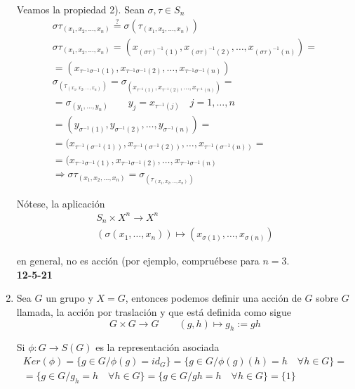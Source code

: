 \documentclass{article}
\begin{document}
\begin{enumerate}[1)]
Veamos la propiedad 2). Sean $\sigma, \tau \in S_n$
\begin{gather*}
\sigma\tau_{(x_1,x_2,\ldots,x_n)} \overset{?}{=} \sigma(\tau_{(x_1,x_2,\ldots,x_n)}) \\
\sigma\tau_{(x_1,x_2,\ldots,x_n)}=(x_{(\sigma\tau)^{-1}(1)},x_{(\sigma\tau)^{-1}(2)},\ldots,x_{(\sigma\tau)^{-1}(n)})= \\
=(x_{\tau^{-1}\sigma^{-1}(1)},x_{\tau^{-1}\sigma^{-1}(2)},\ldots,x_{\tau^{-1}\sigma^{-1}(n)}) \\
\sigma_{(\tau_{(x_1,x_2,\ldots,x_n)})}=\sigma_{(x_{\tau^{-1}(1)},x_{\tau^{-1}(2)},\ldots,x_{\tau^{-1}(n)})}=\\
=\sigma_{(y_1,\ldots,y_n)} \qquad y_j=x_{\tau^{-1}(j)} \quad j=1,\ldots,n \\
=(y_{\sigma^{-1}(1)},y_{\sigma^{-1}(2)},\ldots,y_{\sigma^{-1}(n)})= \\
=(x_{\tau^{-1}(\sigma^{-1}(1))},x_{\tau^{-1}(\sigma^{-1}(2))},\ldots,x_{\tau^{-1}(\sigma^{-1}(n))}=\\
=(x_{\tau^{-1}\sigma^{-1}(1)},x_{\tau^{-1}\sigma^{-1}(2)},\ldots,x_{\tau^{-1}\sigma^{-1}(n)} \\
\Rightarrow \sigma\tau_{(x_1,x_2,\ldots,x_n)}=\sigma_{(\tau_{(x_1,x_2,\ldots,x_n)})}
\end{gather*}

Nótese, la aplicación
\begin{gather*}
S_n\times X^n\longrightarrow X^n\\
(\sigma(x_1,\ldots,x_n))\longmapsto (x_{\sigma(1)},\ldots,x_{\sigma(n)})
\end{gather*}

en general, no es acción (por ejemplo, compruébese para $n=3$. \\

\textbf{12-5-21}

\item Sea $G$ un grupo y $X=G$, entonces podemos definir una acción de $G$ sobre $G$ llamada, la acción por traslación y que está definida como sigue
\begin{equation*}
G\times G\longrightarrow G\qquad (g,h)\longmapsto g_h:=gh
\end{equation*}


Si $\phi:G\longrightarrow S(G)$ es la representación asociada
\begin{gather*}
Ker(\phi)=\{g\in G/\phi(g)=id_G\}=\{g\in G/\phi(g)(h)=h\quad \forall h\in G\}=\\
=\{g\in G/g_h=h\quad \forall h\in G\}=\{g\in G/gh=h\quad \forall h\in G\}=\{1\}
\end{gather*}


\end{enumerate}
\end{document}
